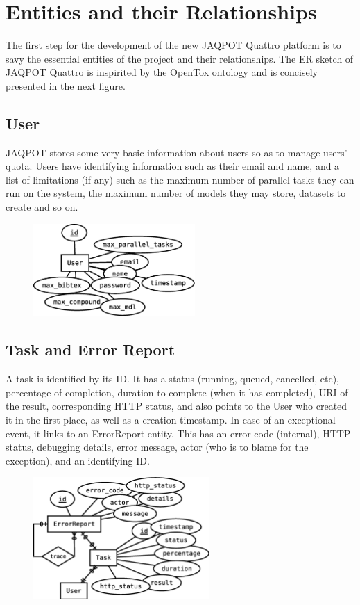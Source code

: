 \section{Entities and their Relationships}

The first step for the development of the new JAQPOT Quattro
platform is to savy the essential entities of the project
and their relationships.
The ER sketch of JAQPOT Quattro is inspirited by the OpenTox
ontology and is concisely presented in the next figure.

\subsection{User}
JAQPOT stores some very basic information about users so as to
manage users' quota. Users have identifying information such as 
their email and name, and a list of limitations (if any) such 
as the maximum number of parallel tasks they can run on the system,
the maximum number of models they may store, datasets to create and
so on.

\begin{figure}[h]
 \centering
 \includegraphics[keepaspectratio=true,width=0.55\textwidth]{figures/user}
\end{figure}

\subsection{Task and Error Report}
A task is identified by its ID. It has a status (running, queued,
cancelled, etc), percentage of completion, duration to complete (when
it has completed), URI of the result, corresponding HTTP status, 
and also points to the User who created it in the first place, 
as well as a creation timestamp. In case of an exceptional 
event, it links to an ErrorReport entity. This has an error code
(internal), HTTP status, debugging details, error message, 
actor (who is to blame for the exception), and an identifying ID.

\begin{figure}[h]
 \centering
 \includegraphics[keepaspectratio=true,width=0.6\textwidth]{figures/task_error}
\end{figure}


